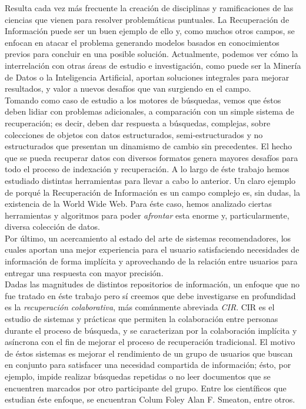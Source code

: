 Resulta cada vez más frecuente la creación de disciplinas y ramificaciones de las ciencias que vienen para resolver problemáticas puntuales. La Recuperación de Información puede ser un buen ejemplo de ello y, como muchos otros campos, se enfocan en atacar el problema generando modelos basados en conocimientos previos para concluir en una posible solución. Actualmente, podemos ver cómo la interrelación con otras áreas de estudio e investigación, como puede ser la Minería de Datos o la Inteligencia Artificial, aportan soluciones integrales para mejorar resultados, y valor a nuevos desafíos que van surgiendo en el campo. \\

Tomando como caso de estudio a los motores de búsquedas, vemos que éstos deben lidiar con problemas adicionales, a comparación con un simple sistema de recuperación; es decir, deben dar respuesta a búsquedas, complejas, sobre colecciones de objetos con datos estructurados, semi-estructurados y no estructurados que presentan un dinamismo de cambio sin precedentes. El hecho que se pueda recuperar datos con diversos formatos genera mayores desafíos para todo el proceso de indexación y recuperación. A lo largo de éste trabajo hemos estudiado distintas herramientas para llevar a cabo lo anterior. Un claro ejemplo de porqué la Recuperación de Información es un campo complejo es, sin dudas, la existencia de la World Wide Web. Para éste caso, hemos analizado ciertas herramientas y algoritmos para poder \textit{afrontar} esta enorme y, particularmente, diversa colección de datos. \\

Por último, un acercamiento al estado del arte de sistemas recomendadores, los cuales aportan una mejor experiencia para el usuario satisfaciendo necesidades de información de forma implícita y aprovechando de la relación entre usuarios para entregar una respuesta con mayor precisión. \\

Dadas las magnitudes de distintos repositorios de información, un enfoque que no fue tratado en éste trabajo pero sí creemos que debe investigarse en profundidad es la \textit{recuperación colaborativa}, más comúnmente abreviada \textit{CIR}. CIR es el estudio de sistemas y prácticas que permiten la colaboración entre personas durante el proceso de búsqueda, y se caracterizan por la colaboración implícita y asíncrona con el fin de mejorar el proceso de recuperación tradicional. El motivo de éstos sistemas es mejorar el rendimiento de un grupo de usuarios que buscan en conjunto para satisfacer una necesidad compartida de información; ésto, por ejemplo, impide realizar búsquedas repetidas o no leer documentos que se encuentren marcados por otro participante del grupo. Entre los científicos que estudian éste enfoque, se encuentran Colum Foley Alan F. Smeaton, entre otros.